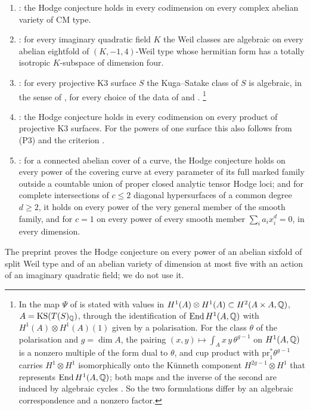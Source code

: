 \begin{enumerate}[label=\textup{(P\arabic*)},leftmargin=2.8em,itemsep=2pt]
\item \cite[Theorem~1.1]{OAI26e}: the Hodge conjecture holds in every
  codimension on every complex abelian variety of CM type.
\item \cite[Theorem~1.1]{OAI26d}: for every imaginary quadratic field $K$ the
  Weil classes are algebraic on every abelian eightfold of
  $(K,-1,4)$-Weil type whose hermitian form has a totally isotropic
  $K$-subspace of dimension four.
\item \cite[Theorem~1.1]{OAI26c}: for every projective K3 surface $S$ the
  Kuga--Satake class of $S$ is algebraic, in the sense of
  , for every choice of the data of
   and .%
\footnote{In \cite{OAI26c} the map $\Psi$ of  is stated
with values in $H^{1}(A)\otimes H^{1}(A)\subset H^{2}(A\times A,\mathbb{Q})$,
$A=\mathrm{KS}(T(S)_{\mathbb{Q}})$, through the identification of
$\operatorname{End} H^{1}(A,\mathbb{Q})$ with $H^{1}(A)\otimes H^{1}(A)(1)$ given by a
polarisation. For the class $\theta$ of the polarisation and $g=\dim A$, the
pairing $(x,y)\mapsto\int_{A}x\,y\,\theta^{g-1}$ on $H^{1}(A,\mathbb{Q})$ is a
nonzero multiple of the form dual to $\theta$, and cup product with
$\mathrm{pr}_{1}^{*}\theta^{g-1}$ carries $H^{1}\otimes H^{1}$ isomorphically
onto the K\"unneth component $H^{2g-1}\otimes H^{1}$ that represents
$\operatorname{End} H^{1}(A,\mathbb{Q})$; both maps and the inverse of the second are induced by
algebraic cycles \cite[\S2]{Kle68}. So the two formulations differ by an
algebraic correspondence and a nonzero factor.}
\item \cite[Theorem~1.1]{OAI26f}: the Hodge conjecture holds in every
  codimension on every product of projective K3 surfaces. For the powers of
  one surface this also follows from (P3) and the criterion
  \cite[Theorem~1.1]{OAI26b}.
\item \cite[Theorems~1.1 and~1.2]{OAI26a}: for a connected abelian cover of a
  curve, the Hodge conjecture holds on every power of the covering curve at
  every parameter of its full marked family outside a countable union of
  proper closed analytic tensor Hodge loci; and for complete intersections
  of $c\le2$ diagonal hypersurfaces of a common degree $d\ge2$, it holds on
  every power of the very general member of the smooth family, and for $c=1$
  on every power of every smooth member $\sum_{i}a_{i}x_{i}^{d}=0$, in every
  dimension.
\end{enumerate}
The preprint \cite{OAI26g} proves the Hodge conjecture on every power of an
abelian sixfold of split Weil type and of an abelian variety of dimension at
most five with an action of an imaginary quadratic field; we do not use it.

